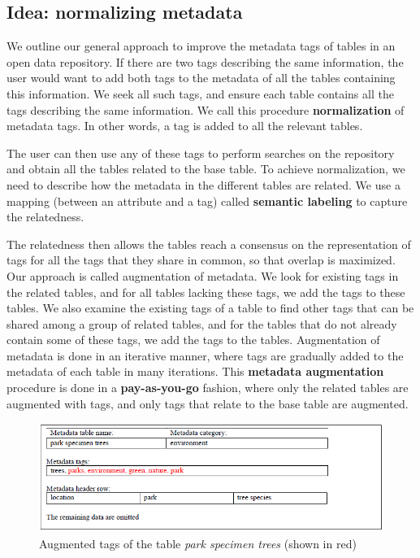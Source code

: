 \subsection{Idea: normalizing metadata}
\label{sec:intro:normalizing}

We outline our general approach to improve the metadata tags of tables in an open data repository. If there are two tags describing the same information, the user would want to add both tags to the metadata of all the tables containing this information. We seek all such tags, and ensure each table contains all the tags describing the same information. We call this procedure \textbf{\gls{normalization}} of metadata tags. In other words, a tag is added to all the relevant tables.

The user can then use any of these tags to perform searches on the repository and obtain all the tables related to the base table. To achieve normalization, we need to describe how the metadata in the different tables are related. We use a mapping (between an attribute and a tag) called \textbf{\gls{semantic labeling}} to capture the relatedness.

The relatedness then allows the tables reach a consensus on the representation of tags for all the tags that they share in common, so that overlap is maximized. Our approach is called augmentation of metadata. We look for existing tags in the related tables, and for all tables lacking these tags, we add the tags to these tables. We also examine the existing tags of a table to find other tags that can be shared among a group of related tables, and for the tables that do not already contain some of these tags, we add the tags to the tables. Augmentation of metadata is done in an iterative manner, where tags are gradually added to the metadata of each table in many iterations. This \textbf{\gls{metadata augmentation}} procedure is done in a \textbf{\gls{pay-as-you-go}} fashion, where only the related tables are augmented with tags, and only tags that relate to the base table are augmented.

\begin{figure}
    \centering
    \includegraphics[width=5in]{figures/augmented-park-specimen-trees.png}
    \caption{Augmented tags of the table \textit{park specimen trees} (shown in red)}
    \label{fig:augmented-park-specimen-trees}
\end{figure}

